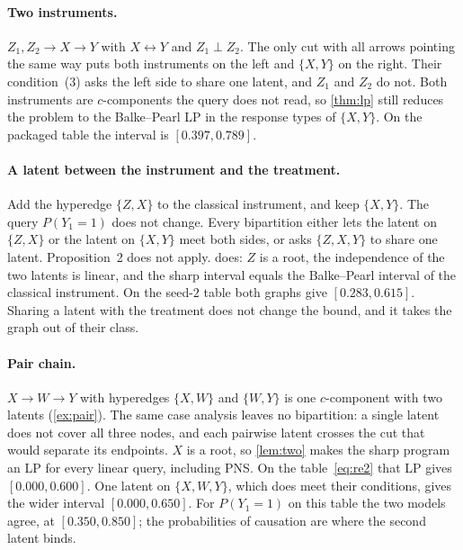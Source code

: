 \paragraph{Two instruments.}
$Z_1,Z_2\to X\to Y$ with $X\leftrightarrow Y$ and $Z_1\perp Z_2$. The only
cut with all arrows pointing the same way puts both instruments on the left
and $\{X,Y\}$ on the right. Their condition~(3) asks the left side to share
one latent, and $Z_1$ and $Z_2$ do not. Both instruments are $c$-components
the query does not read, so \cref{thm:lp} still reduces the problem to the
Balke--Pearl LP in the response types of $\{X,Y\}$. On the packaged table the
interval is $[0.397,0.789]$.

\paragraph{A latent between the instrument and the treatment.}
Add the hyperedge $\{Z,X\}$ to the classical instrument, and keep
$\{X,Y\}$. The query $P(Y_1{=}1)$ does not change. Every bipartition either
lets the latent on $\{Z,X\}$ or the latent on $\{X,Y\}$ meet both sides, or
asks $\{Z,X,Y\}$ to share one latent. Proposition~2 does not apply.
 does: $Z$ is a root, the independence of the two latents is
linear, and the sharp interval equals the Balke--Pearl interval of the
classical instrument. On the seed-$2$ table both graphs give
$[0.283,0.615]$. Sharing a latent with the treatment does not change the
bound, and it takes the graph out of their class.

\paragraph{Pair chain.}
$X\to W\to Y$ with hyperedges $\{X,W\}$ and $\{W,Y\}$ is one $c$-component
with two latents (\cref{ex:pair}). The same case analysis leaves no
bipartition: a single latent does not cover all three nodes, and each
pairwise latent crosses the cut that would separate its endpoints.
$X$ is a root, so \cref{lem:two} makes the sharp program an LP for every
linear query, including PNS. On the table~\eqref{eq:re2} that LP gives
$[0.000,0.600]$. One latent on $\{X,W,Y\}$, which does meet their
conditions, gives the wider interval $[0.000,0.650]$. For $P(Y_1{=}1)$ on
this table the two models agree, at $[0.350,0.850]$; the probabilities of
causation are where the second latent binds.
